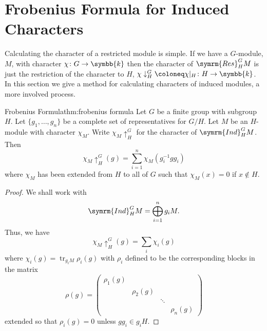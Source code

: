 \documentclass[fleqn]{NotesClass}
\renewcommand{\field}{\symbb{k}}
\DeclareMathOperator{\tr}{tr}
\newcommand{\Res}{\symrm{Res}}
\newcommand{\Ind}{\symrm{Ind}}
\begin{document}
    \section{Frobenius Formula for Induced Characters}
    Calculating the character of a restricted module is simple.
    If we have a \(G\)-module, \(M\), with character \(\chi \colon G \to \field\) then the character of \(\Res^G_HM\) is just the restriction of the character to \(H\), \(\chi\downarrow^G_H \coloneq \chi|_H \colon H \to \field\).
    In this section we give a method for calculating characters of induced modules, a more involved process.
    
    \begin{thm}{Frobenius Formula}{thm:frobenius formula}
        Let \(G\) be a finite group with subgroup \(H\).
        Let \(\{g_1, \dotsc, g_n\}\) be a complete set of representatives for \(G/H\).
        Let \(M\) be an \(H\)-module with character \(\chi_M\).
        Write \(\chi_M\uparrow^G_H\) for the character of \(\Ind^G_H M\).
        Then
        \begin{equation}
            \chi_M\uparrow^G_H(g) = \sum_{i=1}^n \chi_M(g_i^{-1}gg_i)
        \end{equation}
        where \(\chi_M\) has been extended from \(H\) to all of \(G\) such that \(\chi_M(x) = 0\) if \(x \notin H\).
        \begin{proof}
            We shall work with
            \begin{equation}
                \Ind^G_H M = \bigoplus_{i=1}^n g_iM.
            \end{equation}
            Thus, we have
            \begin{equation}
                \chi_M\uparrow^G_H(g) = \sum_i \chi_i(g)
            \end{equation}
            where \(\chi_i(g) = \tr_{g_iM}\rho_i(g)\) with \(\rho_i\) defined to be the corresponding blocks in the matrix
            \begin{equation}
                \rho(g) = 
                \begin{pmatrix}
                    \rho_1(g) & & \\
                    & \rho_2(g) & &\\
                    & & \ddots &\\
                    & & & \rho_n(g)
                \end{pmatrix}
            \end{equation}
            extended so that \(\rho_i(g) = 0\) unless \(gg_i \in g_iH\).
            

\end{proof}
\end{thm}
\end{document}
